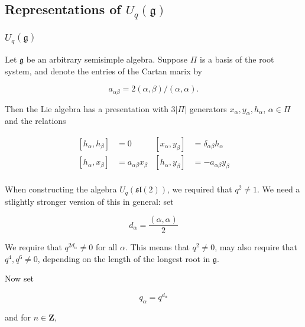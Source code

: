 \documentclass[]{article}
\newcommand{\sll}{\mathfrak{sl}}
\numberwithin{equation}{subsection}
\begin{document}
\subsection{Representations of $U_q(\mathfrak{g})$}
    \subsubsection{$U_q(\mathfrak{g})$}


        Let $\mathfrak{g}$ be an arbitrary semisimple algebra. Suppose $\Pi$ is
        a basis of the root system, and denote the entries of the Cartan marix
        by 

        \begin{equation}
            a_{\alpha\beta} = 2(\alpha, \beta) / (\alpha, \alpha).
        \end{equation}

        Then the Lie algebra has a presentation with $3|\Pi|$ generators $x_\alpha, y_\alpha, h_\alpha$, $\alpha \in \Pi$ and the relations 

        \begin{align}
            \left[ h_\alpha, h_\beta \right] &= 0       &   \left[ x_\alpha, y_\beta \right] &= \delta_{\alpha\beta} h_\alpha \\
            \left[ h_\alpha, x_\beta \right] &= a_{\alpha\beta} x_\beta  &   \left[ h_\alpha, y_\beta \right] &= -a_{\alpha\beta} y_\beta \\
        \end{align}

        When constructing the algebra $U_q(\sll(2))$, we required that $q^2 \neq 1$. We need a stlightly stronger version of this in general: set

        \begin{equation}
            d_\alpha = \frac{(\alpha, \alpha)}{2}
        \end{equation}

        We require that $q^{2d_{\alpha}} \neq 0$ for all $\alpha$. This means
        that $q^2 \neq 0$, may also require that $q^4, q^6 \neq 0$, depending
        on the length of the longest root in $\mathfrak{g}$.

        Now set 

        \begin{equation}
            q_\alpha = q^{d_\alpha}
        \end{equation}

        and for $n \in \mathbf{Z}$,
\end{document}
